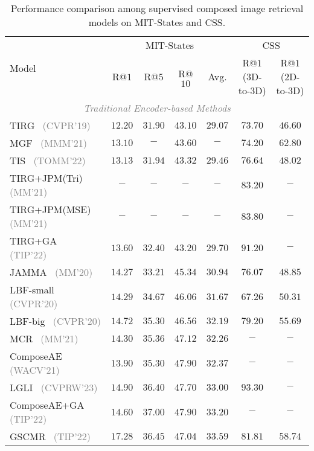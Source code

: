 \begin{table*}
    \scriptsize
    \centering
    \caption{Performance comparison among supervised composed image retrieval models on MIT-States and CSS.}
    \begin{tabular}{l|ccc|c|cc}
    \hline 
    \multirow{2}{*}{Model} & \multicolumn{4}{c|}{MIT-States} & \multicolumn{2}{c}{CSS}  \\
    \cline{2-7}
    & R@$1$ & R@$5$ & R@$10$ & Avg. & R@$1$(3D-to-3D) & R@$1$(2D-to-3D) \\
    \hline \hline 

    \multicolumn{7}{c}{\textit{\textcolor{gray}{Traditional Encoder-based Methods}}} \\
    TIRG~\cite{vo2019tirg} \footnotesize{\textcolor{gray}{(CVPR'19)}} & $12.20$ & $31.90$ & $43.10$ &$29.07$ & $73.70$ & $46.60$\\
    MGF~\cite{liu2021mgf} \footnotesize{\textcolor{gray}{(MMM'21)}} & $13.10$ & $-$ & $43.60$ & $-$ & $74.20$ & $62.80$\\
    TIS~\cite{zhang2022tis} \footnotesize{\textcolor{gray}{(TOMM'22)}} & $13.13$ & $31.94$ & $43.32$ & $29.46$ & $76.64$ & $48.02$\\
    TIRG+JPM(Tri)~\cite{yang2021jpm} \footnotesize{\textcolor{gray}{(MM'21)}} & $-$ & $-$& $-$ & $-$& $83.20$ & $-$\\
    TIRG+JPM(MSE)~\cite{yang2021jpm} \footnotesize{\textcolor{gray}{(MM'21)}} & $-$ & $-$& $-$ & $-$& $83.80$ & $-$\\
    TIRG+GA~\cite{huang2022ga} \footnotesize{\textcolor{gray}{(TIP'22)}} & $13.60$ & $32.40$ & $43.20$ & $29.70$ & $91.20$ & $-$\\
    JAMMA~\cite{zhang2020jamma} \footnotesize{\textcolor{gray}{(MM'20)}} & $14.27$ & $33.21$ & $45.34$ & $30.94$ & $76.07$ & $48.85$\\
    LBF-small~\cite{hosseinzadeh2020lbf} \footnotesize{\textcolor{gray}{(CVPR'20)}} & $14.29$ & $34.67$ & $46.06$ & $31.67$ & $67.26$ & $50.31$\\
    LBF-big~\cite{hosseinzadeh2020lbf} \footnotesize{\textcolor{gray}{(CVPR'20)}} & $14.72$ & $35.30$ & $46.56$ & $32.19$ & $79.20$ & $55.69$\\
    MCR~\cite{zhang2021mcr} \footnotesize{\textcolor{gray}{(MM'21)}} & $14.30$ & $35.36$ & $47.12$ & $32.26$ & $-$ & $-$\\
    ComposeAE~\cite{anwaar2021ComposeAE} \footnotesize{\textcolor{gray}{(WACV'21)}} & $13.90$ & $35.30$ & $47.90$ & $32.37$ & $-$ & $-$\\
    LGLI~\cite{huang2023lgli} \footnotesize{\textcolor{gray}{(CVPRW'23)}} & $14.90$ & $36.40$ & $47.70$ & $33.00$ & $93.30$ & $-$\\
    ComposeAE+GA~\cite{huang2022ga} \footnotesize{\textcolor{gray}{(TIP'22)}} & $14.60$ & $37.00$ & $47.90$ & $33.20$ & $-$ & $-$\\
    GSCMR~\cite{zhang2021GSCMR} \footnotesize{\textcolor{gray}{(TIP'22)}} & $17.28$ & $36.45$ & $47.04$ & $33.59$ & $81.81$ & $58.74$\\
    

\end{tabular}
\end{table*}
